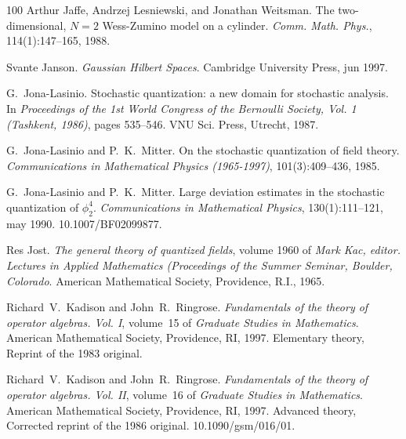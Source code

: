 \documentclass{article}
\newcommand{\tmtextit}[1]{{\itshape{#1}}}
\begin{document}
\begin{thebibliography}{100}
  Arthur Jaffe, Andrzej Lesniewski, and 
  Jonathan Weitsman. {\newblock}The two-dimensional, $N = 2$ Wess-Zumino model
  on a cylinder. {\newblock}\tmtextit{Comm. Math. Phys.}, 114(1):147--165,
  1988.{\newblock}
  
  Svante Janson.
  {\newblock}\tmtextit{Gaussian Hilbert Spaces}. {\newblock}Cambridge
  University Press, jun 1997.{\newblock}
  
  G.~Jona-Lasinio.
  {\newblock}Stochastic quantization: a new domain for stochastic analysis.
  {\newblock}In \tmtextit{Proceedings of the 1st World Congress of the
  Bernoulli Society, Vol. 1 (Tashkent, 1986)},  pages  535--546. VNU Sci.
  Press, Utrecht, 1987.{\newblock}
  
  G.~Jona-Lasinio  and 
  P.~K.~Mitter. {\newblock}On the stochastic quantization of field theory.
  {\newblock}\tmtextit{Communications in Mathematical Physics (1965-1997)},
  101(3):409--436, 1985.{\newblock}
  
  G.~Jona-Lasinio  and  P.~K.~Mitter.
  {\newblock}Large deviation estimates in the stochastic quantization of
  $\phi^4_2$. {\newblock}\tmtextit{Communications in Mathematical Physics},
  130(1):111--121, may 1990.
  {\newblock}\href{Https://doi.org/10.1007/BF02099877}{}10.1007/BF02099877.{\newblock}
  
  Res Jost. {\newblock}\tmtextit{The general
  theory of quantized fields},  volume  1960  of \tmtextit{Mark Kac, editor.
  Lectures in Applied Mathematics (Proceedings of the Summer Seminar, Boulder,
  Colorado}. {\newblock}American Mathematical Society, Providence, R.I.,
  1965.{\newblock}
  
  Richard~V.~Kadison  and  John~R.~Ringrose.
  {\newblock}\tmtextit{Fundamentals of the theory of operator algebras. Vol.
  I},  volume~15  of \tmtextit{Graduate Studies in Mathematics}.
  {\newblock}American Mathematical Society, Providence, RI, 1997.
  {\newblock}Elementary theory, Reprint of the 1983 original.{\newblock}
  
  Richard~V.~Kadison  and  John~R.~Ringrose.
  {\newblock}\tmtextit{Fundamentals of the theory of operator algebras. Vol.
  II},  volume~16  of \tmtextit{Graduate Studies in Mathematics}.
  {\newblock}American Mathematical Society, Providence, RI, 1997.
  {\newblock}Advanced theory, Corrected reprint of the 1986 original.
  \href{https://doi.org/10.1090/gsm/016/01}{}10.1090/gsm/016/01.{\newblock}
  

\end{thebibliography}
\end{document}
